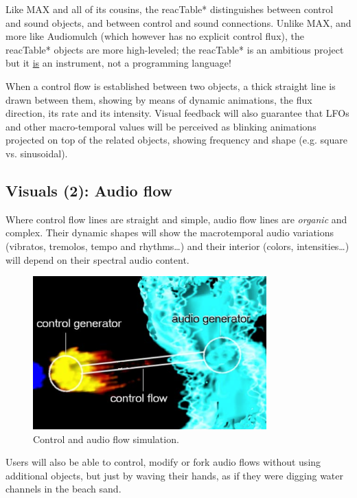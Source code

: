 Like  MAX  and  all  of  its  cousins,  the  reacTable* distinguishes between
control and sound objects, and between control and sound  connections.  Unlike 
MAX, and  more like Audiomulch (which however has no explicit  control flux), the
reacTable*  objects are more high-leveled; the  reacTable*  is an ambitious
project but  it  \underline{is} an  instrument, not  a programming language!

When a control flow is established between two objects, a thick straight line is
drawn between them, showing by means of  dynamic animations, the  flux 
direction,  its  rate  and  its intensity. Visual feedback will also guarantee
that LFOs and other  macro-temporal  values  will  be  perceived  as  blinking animations projected on top of the related objects, showing frequency and
shape (e.g. square vs. sinusoidal).

\subsection{Visuals (2): Audio flow}

Where control flow lines are straight and simple, audio flow lines are \textit{organic}
and  complex.  Their  dynamic  shapes  will show the macrotemporal audio
variations (vibratos, tremolos, tempo and rhythms\ldots{}) and their interior
(colors, intensities\ldots{}) will depend on their spectral audio content.

\begin{figure}[t]
\centering
\includegraphics[width=9cm]{jorda-fig7.png}
\caption{Control  and audio flow simulation.}
\label{Jorda:fig:control-audio-flow} 
\end{figure}

Users  will also be able to control, modify or  fork  audio flows  without 
using  additional  objects,  but  just  by  waving their hands, as if they were
digging water channels in the beach sand.

